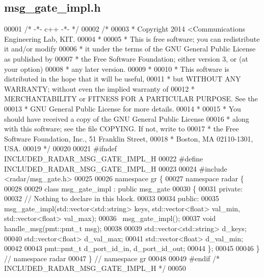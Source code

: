 \subsection{msg\+\_\+gate\+\_\+impl.\+h}
\label{msg__gate__impl_8h_source}

\begin{DoxyCode}
00001 \textcolor{comment}{/* -*- c++ -*- */}
00002 \textcolor{comment}{/* }
00003 \textcolor{comment}{ * Copyright 2014 <Communications Engineering Lab, KIT.}
00004 \textcolor{comment}{ * }
00005 \textcolor{comment}{ * This is free software; you can redistribute it and/or modify}
00006 \textcolor{comment}{ * it under the terms of the GNU General Public License as published by}
00007 \textcolor{comment}{ * the Free Software Foundation; either version 3, or (at your option)}
00008 \textcolor{comment}{ * any later version.}
00009 \textcolor{comment}{ * }
00010 \textcolor{comment}{ * This software is distributed in the hope that it will be useful,}
00011 \textcolor{comment}{ * but WITHOUT ANY WARRANTY; without even the implied warranty of}
00012 \textcolor{comment}{ * MERCHANTABILITY or FITNESS FOR A PARTICULAR PURPOSE.  See the}
00013 \textcolor{comment}{ * GNU General Public License for more details.}
00014 \textcolor{comment}{ * }
00015 \textcolor{comment}{ * You should have received a copy of the GNU General Public License}
00016 \textcolor{comment}{ * along with this software; see the file COPYING.  If not, write to}
00017 \textcolor{comment}{ * the Free Software Foundation, Inc., 51 Franklin Street,}
00018 \textcolor{comment}{ * Boston, MA 02110-1301, USA.}
00019 \textcolor{comment}{ */}
00020  
00021 \textcolor{preprocessor}{#ifndef INCLUDED\_RADAR\_MSG\_GATE\_IMPL\_H}
00022 \textcolor{preprocessor}{#define INCLUDED\_RADAR\_MSG\_GATE\_IMPL\_H}
00023 
00024 \textcolor{preprocessor}{#include <radar/msg_gate.h>}
00025 
00026 \textcolor{keyword}{namespace }gr \{
00027   \textcolor{keyword}{namespace }radar \{
00028 
00029     \textcolor{keyword}{class }msg_gate_impl : \textcolor{keyword}{public} msg_gate
00030     \{
00031      \textcolor{keyword}{private}:
00032       \textcolor{comment}{// Nothing to declare in this block.}
00033 
00034      \textcolor{keyword}{public}:
00035       msg_gate_impl(std::vector<std::string> keys, std::vector<float> val\_min, std::vector<float> val\_max);
00036       ~msg_gate_impl();
00037       \textcolor{keywordtype}{void} handle_msg(pmt::pmt\_t msg);
00038       
00039       std::vector<std::string> d_keys;
00040       std::vector<float> d_val_max;
00041       std::vector<float> d_val_min;
00042       
00043       pmt::pmt\_t d_port_id_in, d_port_id_out;
00044     \};
00045 
00046   \} \textcolor{comment}{// namespace radar}
00047 \} \textcolor{comment}{// namespace gr}
00048 
00049 \textcolor{preprocessor}{#endif }\textcolor{comment}{/* INCLUDED\_RADAR\_MSG\_GATE\_IMPL\_H */}\textcolor{preprocessor}{}
00050 
\end{DoxyCode}
